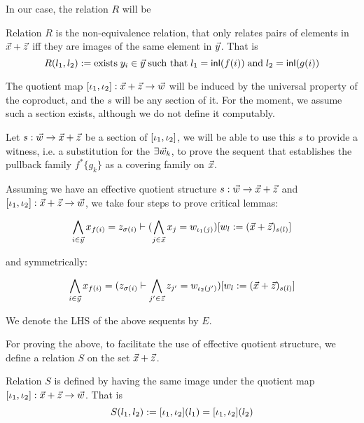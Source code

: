 In our case, the relation $R$ will be 



\begin{definition}[Relation defined by the equalities in $f(i) = g(i)$]
  Relation $R$ is the non-equivalence relation, that only relates pairs of elements in $\vec{x}+\vec{z}$ 
  iff they are images of the same element in $\vec{y}$. That is 
  \begin{equation}
    R(l_1,l_2):= \text{exists}\; y_i \in \vec{y} \;\text{such that}\; l_1 = \mathsf{inl}(f(i))\; \text{and}\;  l_2 = \mathsf{inl}(g(i))
  \end{equation}
\end{definition}

The quotient map $[\iota_1,\iota_2]: \vec{x}+ \vec{z}\to \vec{w}$ will be induced by the
universal property of the coproduct, and the $s$ will be any section of it. For the moment, we assume such a section exists, although we do not define it 
computably.

Let $s:\vec{w}\to \vec{x}+\vec{z}$ be a section of $[\iota_1,\iota_2]$, we will be able to use this $s$ to provide a witness, i.e. a substitution for the $\exists \vec{w}_k$, to prove the
sequent that establishes the pullback family $f^*\{g_k\}$ as a covering family on $\vec{x}$.


Assuming we have an effective quotient structure $s:\vec{w}\to \vec{x}+\vec{z}$ and $[\iota_1,\iota_2]:\vec{x}+\vec{z}\to \vec{w}$, we take four steps to prove critical lemmas:

  \begin{equation*}
    \bigwedge_{i\in \vec{y}} x_{f(i)} = z_{\sigma(i)} \vdash 
     (\bigwedge_{j\in\vec{x}}x_j = w_{\iota_1(j)}) [w_l:=(\vec{x}+\vec{z})_{s(l)}] 
   \end{equation*}

and symmetrically:

\begin{equation*}
  \bigwedge_{i\in \vec{y}} x_{f(i)} = (z_{\sigma(i)} \vdash \bigwedge_{j'\in\vec{z}}z_{j'}= w_{\iota_2(j')}) [w_l:=(\vec{x}+\vec{z})_{s(l)}]
\end{equation*}

We denote the LHS of the above sequents by $E$.

For proving the above, to facilitate the use of effective quotient structure, we define a relation $S$ on the set $\vec{x}+\vec{z}$.
\begin{definition}
  Relation $S$ is defined by having the same image under the quotient map $[\iota_1,\iota_2]:\vec{x}+\vec{z}\to \vec{w}$. That is 
  \begin{equation}
    S(l_1,l_2):= [\iota_1,\iota_2](l_1) = [\iota_1,\iota_2](l_2)
  \end{equation}
\end{definition}



